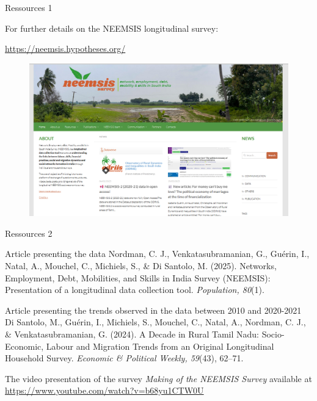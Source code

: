 \documentclass[aspectratio=169]{beamer}
\begin{document}
\begin{frame}{Ressources 1}
\begin{small}

For further details on the NEEMSIS longitudinal survey: 

\begin{center}
\href{https://neemsis.hypotheses.org/}{https://neemsis.hypotheses.org/}
\end{center}
\begin{figure}[h]
\centering
\href{https://neemsis.hypotheses.org/}{\includegraphics[width=0.5\columnwidth]{INPUT/website.png}}
\end{figure}

\end{small}
\end{frame}




\begin{frame}{Ressources 2}
\begin{scriptsize}

\begin{greenbox}{Article presenting the data}
Nordman, C. J., Venkatasubramanian, G., Guérin, I., Natal, A., Mouchel, C., Michiels, S., \& Di Santolo, M. (2025). Networks, Employment, Debt, Mobilities, and Skills in India Survey (NEEMSIS): Presentation of a longitudinal data collection tool. \textit{Population, 80}(1).
\end{greenbox}

\begin{greenbox}{Article presenting the trends observed in the data between 2010 and 2020-2021}
Di Santolo, M., Guérin, I., Michiels, S., Mouchel, C., Natal, A., Nordman, C. J., \& Venkatasubramanian, G. (2024). A Decade in Rural Tamil Nadu: Socio-Economic, Labour and Migration Trends from an Original Longitudinal Household Survey. \textit{Economic \& Political Weekly, 59}(43), 62–71.
\end{greenbox}

\begin{greenbox}{The video presentation of the survey}
\textit{Making of the NEEMSIS Survey} available at \href{https://www.youtube.com/watch?v=b68yu1CTW0U}{https://www.youtube.com/watch?v=b68yu1CTW0U}
\end{greenbox}


\end{scriptsize}
\end{frame}
\end{document}
